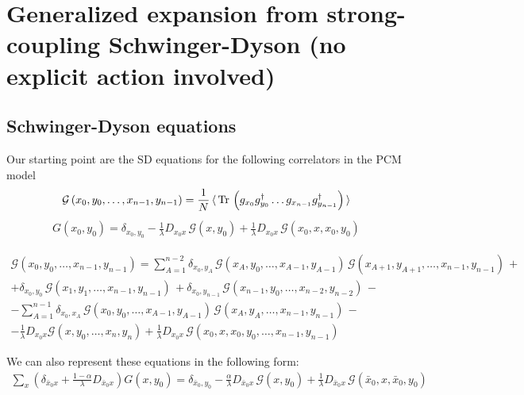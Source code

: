 \documentclass[12pt]{article}
\newcommand{\lr}[1]{ \left( #1 \right) }
\newcommand{\vev}[1]{ \langle \, #1 \, \rangle }
\newcommand{\tr}{ {\rm Tr} \, }
\newcommand{\G}{\mathcal{G}}
\begin{document}
\section*{Generalized expansion from strong-coupling Schwinger-Dyson (no explicit action involved)}

\subsection*{Schwinger-Dyson equations}

Our starting point are the SD equations for the following correlators in the PCM model
\begin{eqnarray}
\label{gf_def}
\G\lr{x_0, y_0, \ldots, x_{n-1}, y_{n-1}}
=
\frac{1}{N}\, \vev{ \tr\lr{
g_{x_0} g^{\dag}_{y_0} \ldots g_{x_{n-1}} g^{\dag}_{y_{n-1}}} }
\end{eqnarray}
\begin{eqnarray}
\label{SDs_n2}
G\lr{x_0, y_0} =
\delta_{x_0, y_0}
 - %
\frac{1}{\lambda} D_{x_0 x} \, \G\lr{x, y_0}
 +
\frac{1}{\lambda} D_{x_0 x} \, \G\lr{x_0, x, x_0, y_0}
\end{eqnarray}

\begin{eqnarray}
\label{SDs}
\G\lr{x_0, y_0, \ldots, x_{n-1}, y_{n-1}}
= %
\sum\limits_{A=1}^{n-2} \delta_{x_0, y_A} \,
\G\lr{x_A, y_0, \ldots, x_{A-1}, y_{A-1}}\,
\G\lr{x_{A+1}, y_{A+1}, \ldots, x_{n-1}, y_{n-1}}\,
+ \nonumber \\ +
\delta_{x_0, y_0} \, \G\lr{x_1, y_1, \ldots, x_{n-1}, y_{n-1}}\,
+
\delta_{x_0, y_{n-1}} \, \G\lr{x_{n-1}, y_0, \ldots, x_{n-2}, y_{n-2}}\,
- \nonumber \\ -
\sum\limits_{A=1}^{n-1} \delta_{x_0, x_A} \,
 \G\lr{x_0, y_0, \ldots, x_{A-1}, y_{A-1}}\,
 \G\lr{x_A, y_A, \ldots, x_{n-1}, y_{n-1}}\,
- \nonumber \\ -
\frac{1}{\lambda} D_{x_0 x} \G\lr{x, y_0, \ldots, x_n, y_n}
+
\frac{1}{\lambda} D_{x_0 x} \, \G\lr{x_0, x, x_0, y_0, \ldots, x_{n-1}, y_{n-1}}
\end{eqnarray}

We can also represent these equations in the following form:
\begin{eqnarray}
\label{SDs_n2_1}
\sum\limits_x \lr{\delta_{\bar{x}_0 x} + \frac{1-\alpha}{\lambda} D_{\bar{x}_0 x} } G\lr{x, y_0} =
\delta_{\bar{x}_0, y_0}
 - %
\frac{\alpha}{\lambda} D_{\bar{x}_0 x} \, \G\lr{x, y_0}
 +
\frac{1}{\lambda} D_{\bar{x}_0 x} \, \G\lr{\bar{x}_0, x, \bar{x}_0, y_0}
\end{eqnarray}
\end{document}
